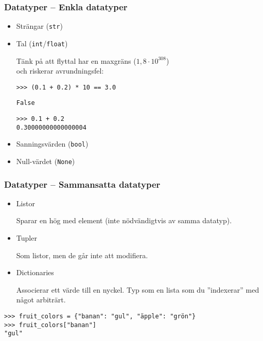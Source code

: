 \documentclass{beamer}
\begin{document}
  \begin{frame}[fragile]
    \frametitle{Datatyper -- Enkla datatyper}

    \pause{}

    \begin{itemize}
      \item Strängar (\texttt{str})
      \pause{}

      \item Tal (\texttt{int}/\texttt{float})
      \pause{}

        Tänk på att flyttal har en maxgräns (\(1,8 \cdot 10^{308}\)) \\
        \pause{}
        och riskerar avrundningsfel:
        \pause{}

\begin{verbatim}
>>> (0.1 + 0.2) * 10 == 3.0
\end{verbatim}
\vspace{-0.5em}
\pause{}
\begin{verbatim}
False
\end{verbatim}
\pause{}
\begin{verbatim}
>>> 0.1 + 0.2
0.30000000000000004
\end{verbatim}
\vspace{-0.5em}

      \pause{}
      \item Sanningsvärden (\texttt{bool})

      \pause{}
      \item Null-värdet (\texttt{None})

    \end{itemize}

  \end{frame}

  \begin{frame}[fragile]
    \frametitle{Datatyper -- Sammansatta datatyper}

    \pause{}

    \begin{itemize}
      \item Listor

      Sparar en hög med element (inte nödvändigtvis av samma datatyp).

      \pause{}

      \item Tupler

      Som listor, men de går inte att modifiera.

      \pause{}

      \item Dictionaries

      Associerar ett värde till en nyckel. Typ som en lista som du ''indexerar''
      med något arbiträrt.

    \end{itemize}

    \pause{}

    \begin{verbatim}
>>> fruit_colors = {"banan": "gul", "äpple": "grön"}
>>> fruit_colors["banan"]
"gul"
    \end{verbatim}


  \end{frame}
\end{document}
